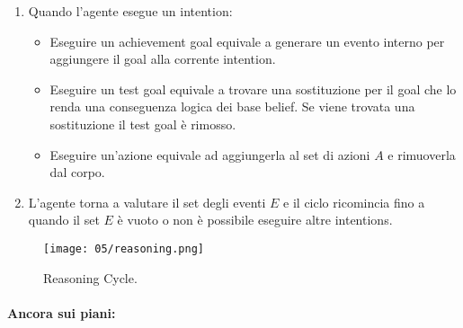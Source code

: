 \begin{enumerate}
\begin{itemize}
    \end{itemize}
  \item Quando l'agente esegue un intention:
    \begin{itemize}
      \item Eseguire un achievement goal equivale a generare un evento interno per aggiungere il goal alla corrente intention. 
      \item Eseguire un test goal equivale a trovare una sostituzione per il goal che lo renda una conseguenza logica dei base belief. Se viene trovata una sostituzione il test goal è rimosso. 
      \item Eseguire un'azione equivale ad aggiungerla al set di azioni $A$ e rimuoverla dal corpo.
    \end{itemize}
  \item L'agente torna a valutare il set degli eventi $E$ e il ciclo ricomincia fino a quando il set $E$ è vuoto o non è possibile eseguire altre intentions. 
\end{enumerate}

\begin{figure}[!h]
    \centering
    \texttt{[image: 05/reasoning.png]}
  \caption{Reasoning Cycle.}
\end{figure}





\paragraph{Ancora sui piani:}

